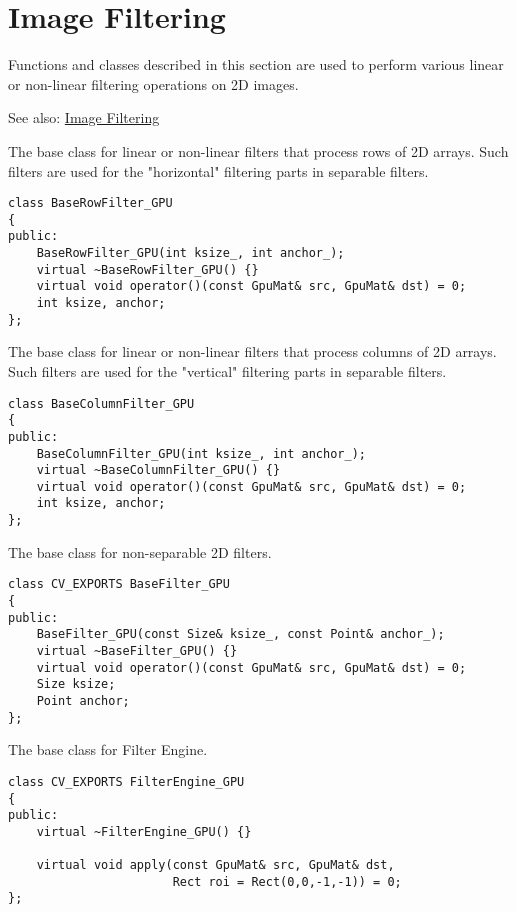 \section{Image Filtering}

Functions and classes described in this section are used to perform various linear or non-linear filtering operations on 2D images.

See also: \hyperref[section.cpp.cpu.ImageFiltering]{Image Filtering}

\label{class.gpu.BaseRowFilter}
The base class for linear or non-linear filters that process rows of 2D arrays. Such filters are used for the "horizontal" filtering parts in separable filters.

\begin{lstlisting}
class BaseRowFilter_GPU
{
public:
    BaseRowFilter_GPU(int ksize_, int anchor_);
    virtual ~BaseRowFilter_GPU() {}
    virtual void operator()(const GpuMat& src, GpuMat& dst) = 0;
    int ksize, anchor;
};
\end{lstlisting}

\label{class.gpu.BaseColumnFilter}
The base class for linear or non-linear filters that process columns of 2D arrays. Such filters are used for the "vertical" filtering parts in separable filters.

\begin{lstlisting}
class BaseColumnFilter_GPU
{
public:
    BaseColumnFilter_GPU(int ksize_, int anchor_);
    virtual ~BaseColumnFilter_GPU() {}
    virtual void operator()(const GpuMat& src, GpuMat& dst) = 0;
    int ksize, anchor;
};
\end{lstlisting}

\label{class.gpu.BaseFilter}
The base class for non-separable 2D filters. 

\begin{lstlisting}
class CV_EXPORTS BaseFilter_GPU
{
public:
    BaseFilter_GPU(const Size& ksize_, const Point& anchor_);
    virtual ~BaseFilter_GPU() {}
    virtual void operator()(const GpuMat& src, GpuMat& dst) = 0;
    Size ksize;
    Point anchor;
};
\end{lstlisting}

\label{class.gpu.FilterEngine}
The base class for Filter Engine.

\begin{lstlisting}
class CV_EXPORTS FilterEngine_GPU
{
public:
    virtual ~FilterEngine_GPU() {}

    virtual void apply(const GpuMat& src, GpuMat& dst, 
                       Rect roi = Rect(0,0,-1,-1)) = 0;
};
\end{lstlisting}

